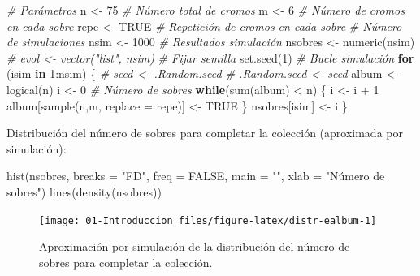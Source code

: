\documentclass[
]{book}
\newenvironment{Shaded}{\begin{snugshade}}{\end{snugshade}}
\newcommand{\AttributeTok}[1]{\textcolor[rgb]{0.77,0.63,0.00}{#1}}
\newcommand{\CommentTok}[1]{\textcolor[rgb]{0.56,0.35,0.01}{\textit{#1}}}
\newcommand{\ConstantTok}[1]{\textcolor[rgb]{0.00,0.00,0.00}{#1}}
\newcommand{\ControlFlowTok}[1]{\textcolor[rgb]{0.13,0.29,0.53}{\textbf{#1}}}
\newcommand{\DecValTok}[1]{\textcolor[rgb]{0.00,0.00,0.81}{#1}}
\newcommand{\FunctionTok}[1]{\textcolor[rgb]{0.00,0.00,0.00}{#1}}
\newcommand{\NormalTok}[1]{#1}
\newcommand{\OtherTok}[1]{\textcolor[rgb]{0.56,0.35,0.01}{#1}}
\newcommand{\SpecialCharTok}[1]{\textcolor[rgb]{0.00,0.00,0.00}{#1}}
\newcommand{\StringTok}[1]{\textcolor[rgb]{0.31,0.60,0.02}{#1}}
\theoremstyle{break}
\theoremstyle{nonumberplain}
\begin{document}
\begin{Shaded}
\begin{Highlighting}[]
\CommentTok{\# Parámetros}
\NormalTok{n }\OtherTok{\textless{}{-}} \DecValTok{75} \CommentTok{\# Número total de cromos}
\NormalTok{m }\OtherTok{\textless{}{-}} \DecValTok{6}  \CommentTok{\# Número de cromos en cada sobre}
\NormalTok{repe }\OtherTok{\textless{}{-}} \ConstantTok{TRUE} \CommentTok{\# Repetición de cromos en cada sobre}
\CommentTok{\# Número de simulaciones}
\NormalTok{nsim }\OtherTok{\textless{}{-}} \DecValTok{1000}
\CommentTok{\# Resultados simulación}
\NormalTok{nsobres }\OtherTok{\textless{}{-}} \FunctionTok{numeric}\NormalTok{(nsim)}
\CommentTok{\# evol \textless{}{-} vector("list", nsim)}
\CommentTok{\# Fijar semilla}
\FunctionTok{set.seed}\NormalTok{(}\DecValTok{1}\NormalTok{)}
\CommentTok{\# Bucle simulación}
\ControlFlowTok{for}\NormalTok{ (isim }\ControlFlowTok{in} \DecValTok{1}\SpecialCharTok{:}\NormalTok{nsim) \{}
  \CommentTok{\# seed \textless{}{-} .Random.seed    \# .Random.seed \textless{}{-} seed}
\NormalTok{  album }\OtherTok{\textless{}{-}} \FunctionTok{logical}\NormalTok{(n)}
\NormalTok{  i }\OtherTok{\textless{}{-}} \DecValTok{0} \CommentTok{\# Número de sobres}
  \ControlFlowTok{while}\NormalTok{(}\FunctionTok{sum}\NormalTok{(album) }\SpecialCharTok{\textless{}}\NormalTok{ n) \{}
\NormalTok{    i }\OtherTok{\textless{}{-}}\NormalTok{ i }\SpecialCharTok{+} \DecValTok{1}
\NormalTok{    album[}\FunctionTok{sample}\NormalTok{(n,m, }\AttributeTok{replace =}\NormalTok{ repe)] }\OtherTok{\textless{}{-}} \ConstantTok{TRUE}
\NormalTok{  \}}
\NormalTok{  nsobres[isim] }\OtherTok{\textless{}{-}}\NormalTok{ i}
\NormalTok{\}}
\end{Highlighting}
\end{Shaded}

Distribución del número de sobres para completar la colección
(aproximada por simulación):

\begin{Shaded}
\begin{Highlighting}[]
\FunctionTok{hist}\NormalTok{(nsobres, }\AttributeTok{breaks =} \StringTok{"FD"}\NormalTok{, }\AttributeTok{freq =} \ConstantTok{FALSE}\NormalTok{,}
     \AttributeTok{main =} \StringTok{""}\NormalTok{, }\AttributeTok{xlab =} \StringTok{"Número de sobres"}\NormalTok{)}
\FunctionTok{lines}\NormalTok{(}\FunctionTok{density}\NormalTok{(nsobres))}
\end{Highlighting}
\end{Shaded}

\begin{figure}[!htb]

{\centering \texttt{[image: 01-Introduccion\_files/figure-latex/distr-ealbum-1]} 

}

\caption{Aproximación por simulación de la distribución del número de sobres para completar la colección.}\label{fig:distr-ealbum}
\end{figure}
\end{document}
